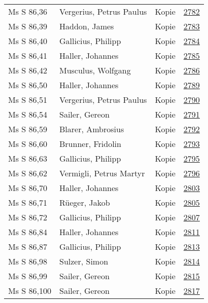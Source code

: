 \documentclass[10pt,a4paper,landscape]{report}
\begin{document}
\begin{longtable}{p{16cm}p{4cm}lr}
Ms S 86,36	&	Vergerius, Petrus Paulus	&	Kopie	&	\href{http://130.60.24.72/assignment/2782}{2782}\\
Ms S 86,39	&	Haddon, James	&	Kopie	&	\href{http://130.60.24.72/assignment/2783}{2783}\\
Ms S 86,40	&	Gallicius, Philipp	&	Kopie	&	\href{http://130.60.24.72/assignment/2784}{2784}\\
Ms S 86,41	&	Haller, Johannes	&	Kopie	&	\href{http://130.60.24.72/assignment/2785}{2785}\\
Ms S 86,42	&	Musculus, Wolfgang	&	Kopie	&	\href{http://130.60.24.72/assignment/2786}{2786}\\
Ms S 86,50	&	Haller, Johannes	&	Kopie	&	\href{http://130.60.24.72/assignment/2789}{2789}\\
Ms S 86,51	&	Vergerius, Petrus Paulus	&	Kopie	&	\href{http://130.60.24.72/assignment/2790}{2790}\\
Ms S 86,54	&	Sailer, Gereon	&	Kopie	&	\href{http://130.60.24.72/assignment/2791}{2791}\\
Ms S 86,59	&	Blarer, Ambrosius	&	Kopie	&	\href{http://130.60.24.72/assignment/2792}{2792}\\
Ms S 86,60	&	Brunner, Fridolin	&	Kopie	&	\href{http://130.60.24.72/assignment/2793}{2793}\\
Ms S 86,63	&	Gallicius, Philipp	&	Kopie	&	\href{http://130.60.24.72/assignment/2795}{2795}\\
Ms S 86,62	&	Vermigli, Petrus Martyr	&	Kopie	&	\href{http://130.60.24.72/assignment/2796}{2796}\\
Ms S 86,70	&	Haller, Johannes	&	Kopie	&	\href{http://130.60.24.72/assignment/2803}{2803}\\
Ms S 86,71	&	Rüeger, Jakob	&	Kopie	&	\href{http://130.60.24.72/assignment/2805}{2805}\\
Ms S 86,72	&	Gallicius, Philipp	&	Kopie	&	\href{http://130.60.24.72/assignment/2807}{2807}\\
Ms S 86,84	&	Haller, Johannes	&	Kopie	&	\href{http://130.60.24.72/assignment/2811}{2811}\\
Ms S 86,87	&	Gallicius, Philipp	&	Kopie	&	\href{http://130.60.24.72/assignment/2813}{2813}\\
Ms S 86,98	&	Sulzer, Simon	&	Kopie	&	\href{http://130.60.24.72/assignment/2814}{2814}\\
Ms S 86,99	&	Sailer, Gereon	&	Kopie	&	\href{http://130.60.24.72/assignment/2815}{2815}\\
Ms S 86,100	&	Sailer, Gereon	&	Kopie	&	\href{http://130.60.24.72/assignment/2817}{2817}\\

\end{longtable}
\end{document}

